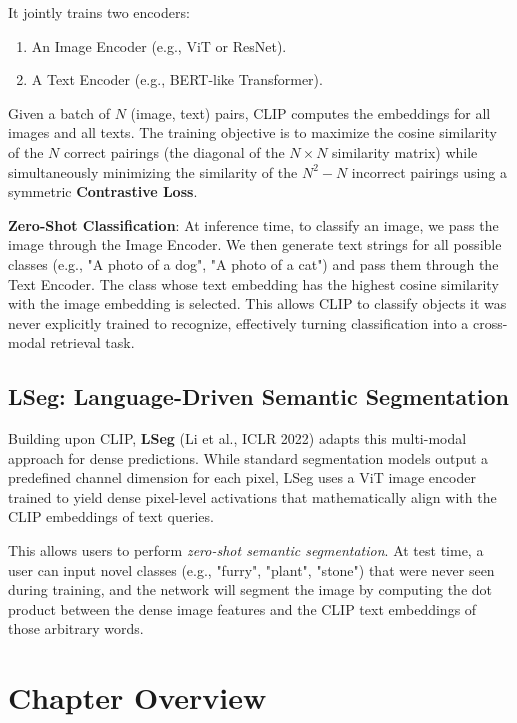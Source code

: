 It jointly trains two encoders:
\begin{enumerate}
    \item An Image Encoder (e.g., ViT or ResNet).
    \item A Text Encoder (e.g., BERT-like Transformer).
\end{enumerate}

Given a batch of $N$ (image, text) pairs, CLIP computes the embeddings for all images and all texts. The training objective is to maximize the cosine similarity of the $N$ correct pairings (the diagonal of the $N \times N$ similarity matrix) while simultaneously minimizing the similarity of the $N^2 - N$ incorrect pairings using a symmetric \textbf{Contrastive Loss}.

\textbf{Zero-Shot Classification}: At inference time, to classify an image, we pass the image through the Image Encoder. We then generate text strings for all possible classes (e.g., "A photo of a dog", "A photo of a cat") and pass them through the Text Encoder. The class whose text embedding has the highest cosine similarity with the image embedding is selected. This allows CLIP to classify objects it was never explicitly trained to recognize, effectively turning classification into a cross-modal retrieval task.

\subsection{LSeg: Language-Driven Semantic Segmentation}
Building upon CLIP, \textbf{LSeg} (Li et al., ICLR 2022) adapts this multi-modal approach for dense predictions. While standard segmentation models output a predefined channel dimension for each pixel, LSeg uses a ViT image encoder trained to yield dense pixel-level activations that mathematically align with the CLIP embeddings of text queries.

This allows users to perform \textit{zero-shot semantic segmentation}. At test time, a user can input novel classes (e.g., "furry", "plant", "stone") that were never seen during training, and the network will segment the image by computing the dot product between the dense image features and the CLIP text embeddings of those arbitrary words.

\section{Chapter Overview}

